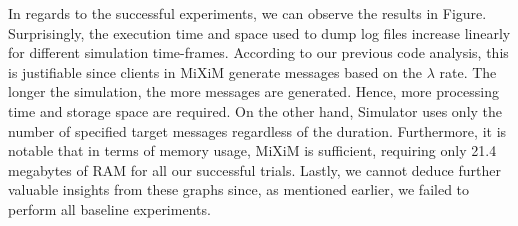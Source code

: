 \documentclass[logo,msc,cyber]{infthesis}   %
\begin{document}
In regards to the successful experiments, we can observe the results in Figure.
Surprisingly, the execution time and space used to dump log files increase
linearly for different simulation time-frames. According to our previous code
analysis, this is justifiable since clients in MiXiM generate messages based on
the $\lambda$ rate. The longer the simulation, the more messages are generated. Hence,
more processing time and storage space are required. On the other hand,
Simulator uses only the number of specified target messages regardless of the
duration. Furthermore, it is notable that in terms of memory usage, MiXiM is
sufficient, requiring only 21.4 megabytes of RAM for all our successful trials.
Lastly, we cannot deduce further valuable insights from these graphs since, as
mentioned earlier, we failed to perform all baseline experiments.
\end{document}
